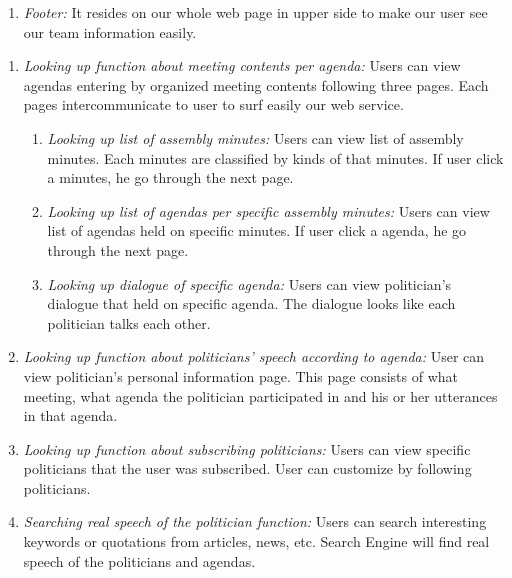 \documentclass[conference]{IEEEtran}
\begin{document}
\begin{enumerate}
\begin{enumerate}
\begin{enumerate}
    \item \textit{Footer:} It resides on our whole web page in upper side to make our user see our team information easily.
    \\
        \end{enumerate}
            \end{enumerate}
    \begin{enumerate}
        \item \textit {Looking up function about meeting contents per agenda:} Users can view agendas entering by organized meeting contents following  three pages. Each pages intercommunicate to user to surf easily our web service.\\
        \begin{enumerate}
            \item \textit {Looking up list of assembly minutes:} Users can view list of assembly minutes. Each minutes are classified by kinds of that minutes. If user click a minutes, he go through the next page.\\
            \item \textit {Looking up list of agendas per specific assembly minutes:} Users can view list of agendas held on specific minutes. If user click a agenda, he go through the next page.\\
            \item \textit {Looking up dialogue of specific agenda:} Users can view politician's dialogue that held on specific agenda. The dialogue looks like each politician talks each other. \\
           
        \end{enumerate}
     
       
        \item \textit {Looking up function about politicians' speech according to agenda:} User can view politician's personal information page. This page consists of what meeting, what agenda the politician participated in and his or her utterances in that agenda.  \\
       
        \item \textit {Looking up function about subscribing politicians:} Users can view specific politicians that the user was subscribed. User can customize by following politicians.\\
       
        \item \textit {Searching real speech of the politician function:} Users can search interesting keywords or quotations from articles, news, etc. Search Engine will find real speech of the politicians and agendas. \\
       

\end{enumerate}
\end{enumerate}
\end{document}
